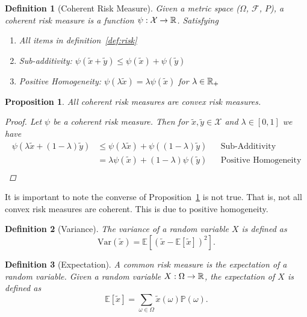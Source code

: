 \documentclass[10pt]{article}
\newtheorem{definition}{Definition}
\theoremstyle{plain}
\newtheorem{proposition}{Proposition}
\theoremstyle{remark}
\begin{document}
\begin{definition}[Coherent Risk Measure]\label{def:coherent-risk-measure}
        Given a metric space ($\Omega$, $\mathcal{F}$, $P$), a coherent risk measure is a function $\psi: \mathcal{X} \to \mathbb{R}$. Satisfying
        \begin{enumerate}
                \item All items in definition~\ref{def:risk}
                \item Sub-additivity: $\psi(\tilde{x} + \tilde{y}) \leq \psi(\tilde{x}) + \psi(\tilde{y})$
                \item Positive Homogeneity: $\psi(\lambda \tilde{x}) = \lambda \psi(\tilde{x})$ for $\lambda \in \mathbb{R}_+$
        \end{enumerate}
\end{definition}

\begin{proposition}\label{prop:coherent-convex}
        All coherent risk measures are convex risk measures.
        \begin{proof}
          Let $\psi$ be a coherent risk measure. Then for $\tilde{x}, \tilde{y} \in \mathcal{X}$ and $\lambda \in [0, 1]$ we have
                \begin{align*}
                        \psi(\lambda \tilde{x} + (1 - \lambda) \tilde{y}) &\leq \psi(\lambda \tilde{x}) + \psi((1 - \lambda) \tilde{y}) &&\text{Sub-Additivity}\\
                        &= \lambda \psi(\tilde{x}) + (1 - \lambda) \psi(\tilde{y}) &&\text{Positive Homogeneity}\\
                \end{align*}
        \end{proof}
\end{proposition}

It is important to note the converse of Proposition~\ref{prop:coherent-convex} is not true. That is, not all convex risk measures are coherent. This is due to positive homogeneity.

\begin{definition}[Variance]\label{def:variance}
        The variance of a random variable $X$ is defined as 
        \[
                \text{Var}(\tilde{x}) = \mathbb{E}[{(\tilde{x} - \mathbb{E}[\tilde{x}])}^2].
        \]
\end{definition}

\begin{definition}[Expectation]\label{def:expectation}
        A common risk measure is the expectation of a random variable. Given a random variable $X: \Omega \to \mathbb{R}$, the expectation of $X$ is defined as
        \[
          \mathbb{E}[\tilde{x}] = \sum_{\omega \in \Omega} \tilde{x}(\omega) \mathbb{P}(\omega).
        \]
\end{definition}
\end{document}
